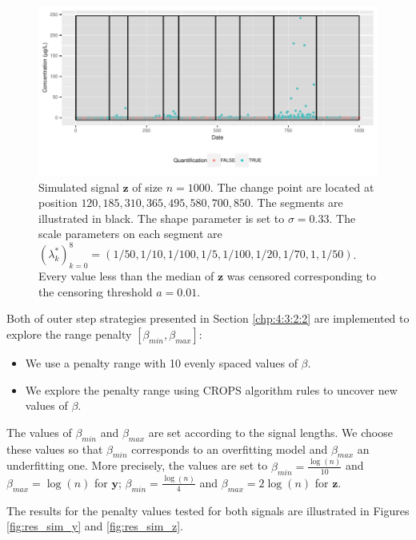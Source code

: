 \begin{figure}[htbp]
    \centering
    \includegraphics{figs/Chap4/y_sim2.pdf}
    \caption{Simulated signal $\bm z$ of size $n = 1000$. The change point are located at position $ 120, 185, 310, 365, 495, 580, 700, 850 $. The segments are illustrated in black. The shape parameter is set to $\sigma = 0.33$. The scale parameters on each segment are $(\lambda^*_k)_{k = 0}^8 = (1/50, 1/10, 1/100, 1/5, 1/100, 1/20, 1/70,1, 1/50)$. Every value less than the median of $\bm z$ was censored corresponding to the censoring threshold $a = 0.01$.}
    \label{fig:y_sim2}
\end{figure}

Both of outer step strategies presented in Section \ref{chp:4:3:2:2} are implemented to explore the range penalty $[\beta_{min},\beta_{max}]$: 
\begin{itemize}
\item We use a penalty range with 10 evenly spaced values of $\beta$.  
\item We explore the penalty range using CROPS algorithm rules to uncover new values of $\beta$.
\end{itemize}

The values of $\beta_{min}$ and $\beta_{max}$ are set according to the signal lengths. We choose these values so that $\beta_{min}$ corresponds to an overfitting model and $\beta_{max}$ an underfitting one. More precisely, the values are set to $\beta_{min} = \frac{\log(n)}{10}$ and $\beta_{max} = \log(n)$ for $\bm y$; $\beta_{min} = \frac{\log(n)}{4}$ and $\beta_{max} = 2\log(n)$ for $\bm z$.

The results for the penalty values tested for both signals are illustrated in Figures \ref{fig:res_sim_y} and \ref{fig:res_sim_z}.

